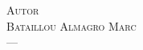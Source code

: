 \begin{titlepage}
\begin{center}
{\large
\begin{center}
  {\Large  \hspace{0.5cm} \textsc{Autor} \hspace{0.5cm}   } \\[0.3cm]
	\textsc{Bataillou Almagro Marc}\\
	  ---
\end{center}
}


{\large \the\year}

\end{center}
\end{titlepage}